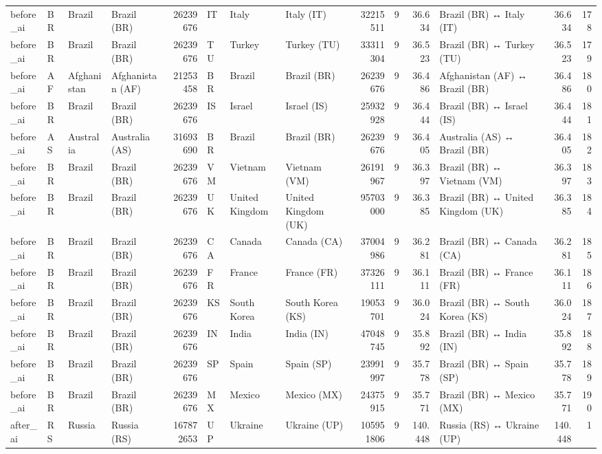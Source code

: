 \begin{tabular}{llllrlllrrrlrr}
before\_ai & BR & Brazil & Brazil (BR) & 26239676 & IT & Italy & Italy (IT) & 32215511 & 9 & 36.634 & Brazil (BR) ↔ Italy (IT) & 36.634 & 178 \\
before\_ai & BR & Brazil & Brazil (BR) & 26239676 & TU & Turkey & Turkey (TU) & 33311304 & 9 & 36.523 & Brazil (BR) ↔ Turkey (TU) & 36.523 & 179 \\
before\_ai & AF & Afghanistan & Afghanistan (AF) & 21253458 & BR & Brazil & Brazil (BR) & 26239676 & 9 & 36.486 & Afghanistan (AF) ↔ Brazil (BR) & 36.486 & 180 \\
before\_ai & BR & Brazil & Brazil (BR) & 26239676 & IS & Israel & Israel (IS) & 25932928 & 9 & 36.444 & Brazil (BR) ↔ Israel (IS) & 36.444 & 181 \\
before\_ai & AS & Australia & Australia (AS) & 31693690 & BR & Brazil & Brazil (BR) & 26239676 & 9 & 36.405 & Australia (AS) ↔ Brazil (BR) & 36.405 & 182 \\
before\_ai & BR & Brazil & Brazil (BR) & 26239676 & VM & Vietnam & Vietnam (VM) & 26191967 & 9 & 36.397 & Brazil (BR) ↔ Vietnam (VM) & 36.397 & 183 \\
before\_ai & BR & Brazil & Brazil (BR) & 26239676 & UK & United Kingdom & United Kingdom (UK) & 95703000 & 9 & 36.385 & Brazil (BR) ↔ United Kingdom (UK) & 36.385 & 184 \\
before\_ai & BR & Brazil & Brazil (BR) & 26239676 & CA & Canada & Canada (CA) & 37004986 & 9 & 36.281 & Brazil (BR) ↔ Canada (CA) & 36.281 & 185 \\
before\_ai & BR & Brazil & Brazil (BR) & 26239676 & FR & France & France (FR) & 37326111 & 9 & 36.111 & Brazil (BR) ↔ France (FR) & 36.111 & 186 \\
before\_ai & BR & Brazil & Brazil (BR) & 26239676 & KS & South Korea & South Korea (KS) & 19053701 & 9 & 36.024 & Brazil (BR) ↔ South Korea (KS) & 36.024 & 187 \\
before\_ai & BR & Brazil & Brazil (BR) & 26239676 & IN & India & India (IN) & 47048745 & 9 & 35.892 & Brazil (BR) ↔ India (IN) & 35.892 & 188 \\
before\_ai & BR & Brazil & Brazil (BR) & 26239676 & SP & Spain & Spain (SP) & 23991997 & 9 & 35.778 & Brazil (BR) ↔ Spain (SP) & 35.778 & 189 \\
before\_ai & BR & Brazil & Brazil (BR) & 26239676 & MX & Mexico & Mexico (MX) & 24375915 & 9 & 35.771 & Brazil (BR) ↔ Mexico (MX) & 35.771 & 190 \\
after\_ai & RS & Russia & Russia (RS) & 167872653 & UP & Ukraine & Ukraine (UP) & 105951806 & 9 & 140.448 & Russia (RS) ↔ Ukraine (UP) & 140.448 & 1 \\

\end{tabular}
